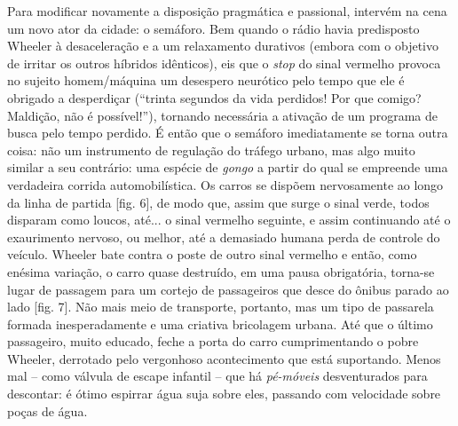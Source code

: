 \begin{multicols}{2}
\par{}Para modificar novamente a disposição pragmática e passional,\allowbreak{} intervém na cena um novo ator da cidade:\allowbreak{} o semáforo.\allowbreak{} Bem quando o rádio havia predisposto Wheeler à desaceleração e a um relaxamento durativos (\allowbreak{}embora com o objetivo de irritar os outros híbridos idênticos)\allowbreak{},\allowbreak{} eis que o \textit{stop} do sinal vermelho provoca no sujeito homem\fshyp{}máquina um desespero neurótico pelo tempo que ele é obrigado a desperdiçar (\allowbreak{}“trinta segundos da vida perdidos!\allowbreak{} Por que comigo? Maldição,\allowbreak{} não é possível!\allowbreak{}”)\allowbreak{},\allowbreak{} tornando necessária a ativação de um programa de busca pelo tempo perdido.\allowbreak{} É então que o semáforo imediatamente se torna outra coisa:\allowbreak{} não um instrumento de regulação do tráfego urbano,\allowbreak{} mas algo muito similar a seu contrário:\allowbreak{} uma espécie de \textit{gongo} a partir do qual se empreende uma verdadeira corrida automobilística.\allowbreak{} Os carros se dispõem nervosamente ao longo da linha de partida [fig.\allowbreak{} 6],\allowbreak{} de modo que,\allowbreak{} assim que surge o sinal verde,\allowbreak{} todos disparam como loucos,\allowbreak{} até.\allowbreak{}.\allowbreak{}.\allowbreak{} o sinal vermelho seguinte,\allowbreak{} e assim continuando até o exaurimento nervoso,\allowbreak{} ou melhor,\allowbreak{} até a demasiado humana perda de controle do veículo.\allowbreak{} Wheeler bate contra o poste de outro sinal vermelho e então,\allowbreak{} como enésima variação,\allowbreak{} o carro quase destruído,\allowbreak{} em uma pausa obrigatória,\allowbreak{} torna-\allowbreak{}se lugar de passagem para um cortejo de passageiros que desce do ônibus parado ao lado [fig.\allowbreak{} 7].\allowbreak{} Não mais meio de transporte,\allowbreak{} portanto,\allowbreak{} mas um tipo de passarela formada inesperadamente e uma criativa bricolagem urbana.\allowbreak{} Até que o último passageiro,\allowbreak{} muito educado,\allowbreak{} feche a porta do carro cumprimentando o pobre Wheeler,\allowbreak{} derrotado pelo vergonhoso acontecimento que está suportando.\allowbreak{} Menos mal – como válvula de escape infantil – que há \textit{pé-\allowbreak{}móveis} desventurados para descontar:\allowbreak{} é ótimo espirrar água suja sobre eles,\allowbreak{} passando com velocidade sobre poças de água.\allowbreak{}
\par
{
\centering{
}}
\end{multicols}
